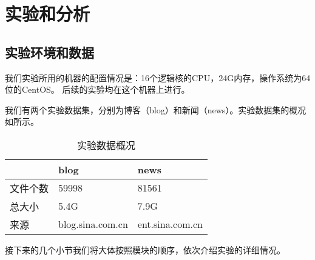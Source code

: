 \section{实验和分析}
\label{sec:result-analysis}

\subsection{实验环境和数据}
\label{sec:dataenv}
我们实验所用的机器的配置情况是：16个逻辑核的CPU，24G内存，操作系统为64位的CentOS。
后续的实验均在这个机器上进行。

我们有两个实验数据集，分别为博客（blog）和新闻（news）。实验数据集的概况
如所示。
\begin{table}[h]
  \centering
\begin{tabular}{lll}
  \toprule
 & blog & news \\
\hline
文件个数 & 59998 & 81561 \\
总大小 & 5.4G & 7.9G \\
来源 & blog.sina.com.cn & ent.sina.com.cn \\
\bottomrule
\end{tabular}
  \caption{实验数据概况}
  \label{experiment:tab:overview}
\end{table}
\begin{comment}
#+ORGTBL: SEND 实验数据概况 orgtbl-to-latex :splice nil :skip 0
|          | blog             | news            |
|----------+------------------+-----------------|
| 文件个数 | 59998            | 81561           |
| 总大小   | 5.4G             | 7.9G            |
| 来源     | blog.sina.com.cn | ent.sina.com.cn |
\end{comment}

接下来的几个小节我们将大体按照模块的顺序，依次介绍实验的详细情况。
\label{sec:results}
